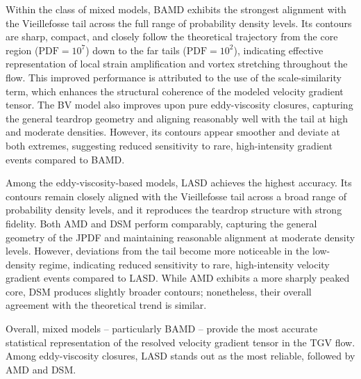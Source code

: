 \documentclass[final,3p]{elsarticle}
\begin{document}
Within the class of mixed models, BAMD exhibits the strongest alignment with the Vieillefosse tail across the full range of probability density levels. Its contours are sharp, compact, and closely follow the theoretical trajectory from the core region (\( \text{PDF} = 10^7 \)) down to the far tails (\( \text{PDF} = 10^2 \)), indicating effective representation of local strain amplification and vortex stretching throughout the flow. This improved performance is attributed to the use of the scale-similarity term, which enhances the structural coherence of the modeled velocity gradient tensor. The BV model also improves upon pure eddy-viscosity closures, capturing the general teardrop geometry and aligning reasonably well with the tail at high and moderate densities. However, its contours appear smoother and deviate at both extremes, suggesting reduced sensitivity to rare, high-intensity gradient events compared to BAMD.

Among the eddy-viscosity-based models, LASD achieves the highest accuracy. Its contours remain closely aligned with the Vieillefosse tail across a broad range of probability density levels, and it reproduces the teardrop structure with strong fidelity. Both AMD and DSM perform comparably, capturing the general geometry of the JPDF and maintaining reasonable alignment at moderate density levels. However, deviations from the tail become more noticeable in the low-density regime, indicating reduced sensitivity to rare, high-intensity velocity gradient events compared to LASD. While AMD exhibits a more sharply peaked core, DSM produces slightly broader contours; nonetheless, their overall agreement with the theoretical trend is similar.

Overall, mixed models -- particularly BAMD -- provide the most accurate statistical representation of the resolved velocity gradient tensor in the TGV flow. Among eddy-viscosity closures, LASD stands out as the most reliable, followed by AMD and DSM.
\end{document}
